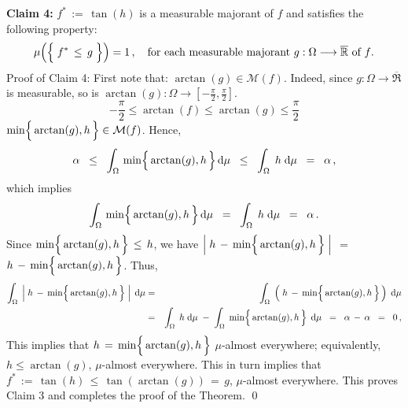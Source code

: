 \vskip 0.8cm
\noindent
\textbf{Claim 4:}\quad
$f^{*} \, := \, \tan(h)$ is a measurable majorant of $f$ and satisfies the following property:
\begin{equation*}
\mu\!\left(\left\{\;f^{*} \,\overset{{\color{white}.}}{\leq}\, g \;\right\}\right) =1\,,
\quad
\textnormal{for each measurable majorant $g : \Omega \longrightarrow \overline{\Re}$ of $f$}.
\end{equation*}
Proof of Claim 4:\;\;
\noindent
First note that: $\arctan(g) \in \mathcal{M}(f)$.
Indeed, since $g : \Omega \longrightarrow \overline{\Re}$ is measurable,
so is $\arctan(g) : \Omega \longrightarrow \left[-\frac{\pi}{2},\frac{\pi}{2}\right]$.
\begin{equation*}
-\dfrac{\pi}{2} \leq \arctan(f) \leq \arctan(g) \leq \dfrac{\pi}{2}
\end{equation*}
$\min\!\left\{\,\arctan(g),\overset{{\color{white}.}}{h}\,\right\} \in \mathcal{M}(f)$.
Hence,
\begin{equation*}
\alpha
\;\; \leq \;\;
	\int_{\Omega}\,\min\!\left\{\,\arctan(g),\overset{{\color{white}.}}{h}\,\right\}\d\mu
\;\; \leq \;\;
	\int_{\Omega}\;h\;\d\mu
\;\; = \;\;
	\alpha\,,
\end{equation*}
which implies
\begin{equation*}
\int_{\Omega}\,\min\!\left\{\,\arctan(g),\overset{{\color{white}.}}{h}\,\right\}\d\mu
\;\; = \;\;
	\int_{\Omega}\;h\;\d\mu
\;\; = \;\;
	\alpha\,.
\end{equation*}
Since $\min\!\left\{\,\arctan(g),\overset{{\color{white}.}}{h}\,\right\} \,\leq\, h$, we have
\;$\left\vert\; h \, - \, \min\!\left\{\,\arctan(g),\overset{{\color{white}.}}{h}\,\right\} \;\right\vert$
\;$=$\;
$h \, - \, \min\!\left\{\,\arctan(g),\overset{{\color{white}.}}{h}\,\right\}$.\;
Thus,
\begin{eqnarray*}
\int_{\Omega}\;\left\vert\; h \, - \, \min\!\left\{\,\arctan(g),\overset{{\color{white}.}}{h}\,\right\} \;\right\vert\;\d\mu
& = &
	\int_{\Omega}\; \left(\;h \, - \, \min\!\left\{\,\arctan(g),\overset{{\color{white}.}}{h}\,\right\}\,\right)\;\d\mu
\\
& = &
	\int_{\Omega}\; h \;\d\mu
	\; - \;
	\int_{\Omega}\; \min\!\left\{\,\arctan(g),\overset{{\color{white}.}}{h}\,\right\}\;\d\mu
\;\; = \;\;
	\alpha \, - \, \alpha
\;\; = \;\;
	0\,,
\end{eqnarray*}
This implies that $h \, = \, \min\!\left\{\,\arctan(g),\overset{{\color{white}.}}{h}\,\right\}$
$\mu$-almost everywhere;
equivalently, $h \leq \arctan(g)$, $\mu$-almost everywhere.
This in turn implies that
$f^{*} \,:=\, \tan(h) \,\leq\, \tan\!\left(\arctan(g)\right) \,=\, g$, $\mu$-almost everywhere.
This proves Claim 3 and completes the proof of the Theorem.
\qed



\renewcommand{\theenumi}{\roman{enumi}}
\renewcommand{\labelenumi}{\textnormal{(\theenumi)}$\;\;$}


